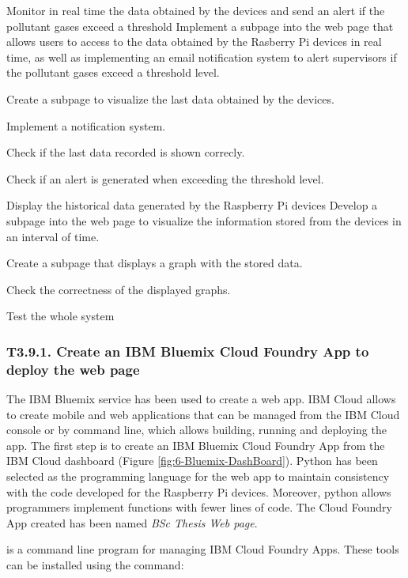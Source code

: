 {Monitor in real time the data obtained by the devices and send an alert if the pollutant gases exceed a threshold}
{Implement a subpage into the web page that allows users to access to the data obtained by the Rasberry Pi devices in real time, as well as implementing an email notification system to alert supervisors if the pollutant gases exceed a threshold level.}
{	\item Create a subpage to visualize the last data obtained by the devices.
	\item Implement a notification system.
}{	\item Check if the last data recorded is shown correcly.
	\item Check if an alert is generated when exceeding the threshold level.
}

{Display the historical data generated by the Raspberry Pi devices}
{Develop a subpage into the web page to visualize the information stored from the devices in an interval of time.}
{	\item Create a subpage that displays a graph with the stored data.
}{	\item Check the correctness of the displayed graphs.
	\item Test the whole system
}


\subsubsection{T3.9.1. Create an IBM Bluemix Cloud Foundry App to deploy the web page}
The IBM Bluemix service has been used to create a web app. IBM Cloud allows to create mobile and web applications that can be managed from the IBM Cloud console or by command line, which allows building, running and deploying the app. The first step is to create an IBM Bluemix Cloud Foundry App from the IBM Cloud dashboard (Figure \ref{fig:6-Bluemix-DashBoard}). Python has been selected as the programming language for the web app to maintain consistency with the code developed for the Raspberry Pi devices. Moreover, python allows programmers implement functions with fewer lines of code. The Cloud Foundry App created has been named \textit{BSc Thesis Web page}.

 is a command line program for managing IBM Cloud Foundry Apps. These tools can be installed using the command:

